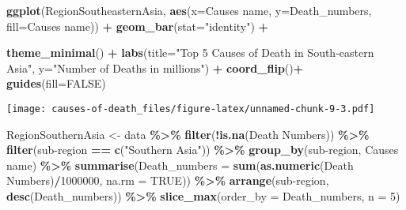 \documentclass[
]{article}
\newenvironment{Shaded}{\begin{snugshade}}{\end{snugshade}}
\newcommand{\AttributeTok}[1]{\textcolor[rgb]{0.13,0.29,0.53}{#1}}
\newcommand{\ConstantTok}[1]{\textcolor[rgb]{0.56,0.35,0.01}{#1}}
\newcommand{\DecValTok}[1]{\textcolor[rgb]{0.00,0.00,0.81}{#1}}
\newcommand{\FunctionTok}[1]{\textcolor[rgb]{0.13,0.29,0.53}{\textbf{#1}}}
\newcommand{\NormalTok}[1]{#1}
\newcommand{\OtherTok}[1]{\textcolor[rgb]{0.56,0.35,0.01}{#1}}
\newcommand{\SpecialCharTok}[1]{\textcolor[rgb]{0.81,0.36,0.00}{\textbf{#1}}}
\newcommand{\StringTok}[1]{\textcolor[rgb]{0.31,0.60,0.02}{#1}}
\begin{document}
\begin{Shaded}
\begin{Highlighting}[]
\FunctionTok{ggplot}\NormalTok{(RegionSoutheasternAsia, }\FunctionTok{aes}\NormalTok{(}\AttributeTok{x=}\StringTok{\textasciigrave{}}\AttributeTok{Causes name}\StringTok{\textasciigrave{}}\NormalTok{, }\AttributeTok{y=}\NormalTok{Death\_numbers, }\AttributeTok{fill=}\StringTok{\textasciigrave{}}\AttributeTok{Causes name}\StringTok{\textasciigrave{}}\NormalTok{)) }\SpecialCharTok{+}
  \FunctionTok{geom\_bar}\NormalTok{(}\AttributeTok{stat=}\StringTok{"identity"}\NormalTok{) }\SpecialCharTok{+}
 
  \FunctionTok{theme\_minimal}\NormalTok{() }\SpecialCharTok{+} 
  \FunctionTok{labs}\NormalTok{(}\AttributeTok{title=}\StringTok{"Top 5 Causes of Death in South{-}eastern Asia"}\NormalTok{,}
       \AttributeTok{y=}\StringTok{"Number of Deaths in millions"}\NormalTok{) }\SpecialCharTok{+}
  \FunctionTok{coord\_flip}\NormalTok{()}\SpecialCharTok{+}
  \FunctionTok{guides}\NormalTok{(}\AttributeTok{fill=}\ConstantTok{FALSE}\NormalTok{)}
\end{Highlighting}
\end{Shaded}

\texttt{[image: causes-of-death\_files/figure-latex/unnamed-chunk-9-3.pdf]}

\begin{Shaded}
\begin{Highlighting}[]
\NormalTok{RegionSouthernAsia }\OtherTok{\textless{}{-}}\NormalTok{ data }\SpecialCharTok{\%\textgreater{}\%}
  \FunctionTok{filter}\NormalTok{(}\SpecialCharTok{!}\FunctionTok{is.na}\NormalTok{(}\StringTok{\textasciigrave{}}\AttributeTok{Death Numbers}\StringTok{\textasciigrave{}}\NormalTok{)) }\SpecialCharTok{\%\textgreater{}\%}
  \FunctionTok{filter}\NormalTok{(}\StringTok{\textasciigrave{}}\AttributeTok{sub{-}region}\StringTok{\textasciigrave{}} \SpecialCharTok{==} \FunctionTok{c}\NormalTok{(}\StringTok{"Southern Asia"}\NormalTok{)) }\SpecialCharTok{\%\textgreater{}\%}
  \FunctionTok{group\_by}\NormalTok{(}\StringTok{\textasciigrave{}}\AttributeTok{sub{-}region}\StringTok{\textasciigrave{}}\NormalTok{, }\StringTok{\textasciigrave{}}\AttributeTok{Causes name}\StringTok{\textasciigrave{}}\NormalTok{) }\SpecialCharTok{\%\textgreater{}\%}
  \FunctionTok{summarise}\NormalTok{(}\AttributeTok{Death\_numbers =} \FunctionTok{sum}\NormalTok{(}\FunctionTok{as.numeric}\NormalTok{(}\StringTok{\textasciigrave{}}\AttributeTok{Death Numbers}\StringTok{\textasciigrave{}}\NormalTok{)}\SpecialCharTok{/}\DecValTok{1000000}\NormalTok{, }\AttributeTok{na.rm =} \ConstantTok{TRUE}\NormalTok{)) }\SpecialCharTok{\%\textgreater{}\%}
  \FunctionTok{arrange}\NormalTok{(}\StringTok{\textasciigrave{}}\AttributeTok{sub{-}region}\StringTok{\textasciigrave{}}\NormalTok{, }\FunctionTok{desc}\NormalTok{(Death\_numbers)) }\SpecialCharTok{\%\textgreater{}\%}
  \FunctionTok{slice\_max}\NormalTok{(}\AttributeTok{order\_by =}\NormalTok{ Death\_numbers, }\AttributeTok{n =} \DecValTok{5}\NormalTok{)}
\end{Highlighting}
\end{Shaded}
\end{document}
